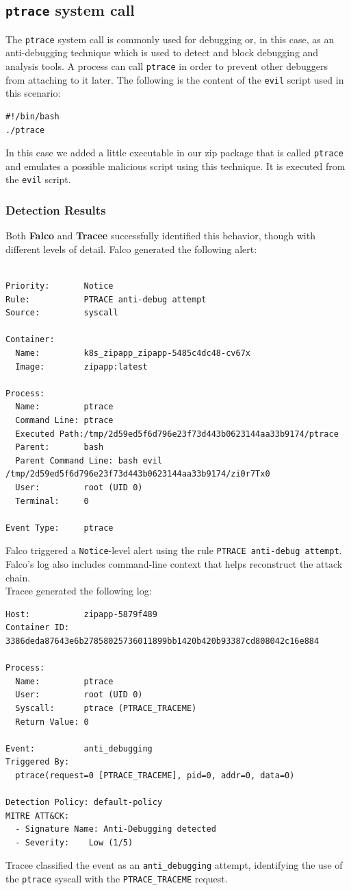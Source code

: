\subsection{\texttt{ptrace} system call}
The \texttt{ptrace} system call is commonly used for debugging or, in this case, as an anti-debugging technique which is used to detect and block debugging and analysis tools. A process can call \texttt{ptrace} in order to prevent other debuggers from attaching to it later. The following is the content of the \texttt{evil} script used in this scenario:
\begin{verbatim}
#!/bin/bash
./ptrace
\end{verbatim}
In this case we added a little executable in our zip package that is called \texttt{ptrace} and emulates a possible malicious script using this technique. It is executed from the \texttt{evil} script.


\subsubsection{Detection Results}
Both \textbf{Falco} and \textbf{Tracee} successfully identified this behavior, though with different levels of detail.
Falco generated the following alert:
\begin{verbatim}

Priority:       Notice
Rule:           PTRACE anti-debug attempt
Source:         syscall

Container:
  Name:         k8s_zipapp_zipapp-5485c4dc48-cv67x
  Image:        zipapp:latest

Process:
  Name:         ptrace
  Command Line: ptrace
  Executed Path:/tmp/2d59ed5f6d796e23f73d443b0623144aa33b9174/ptrace
  Parent:       bash
  Parent Command Line: bash evil /tmp/2d59ed5f6d796e23f73d443b0623144aa33b9174/zi0r7Tx0
  User:         root (UID 0)
  Terminal:     0

Event Type:     ptrace
\end{verbatim}
Falco triggered a \texttt{Notice}-level alert using the rule \texttt{PTRACE anti-debug attempt}. Falco's log also includes command-line context that helps reconstruct the attack chain. \\
Tracee generated the following log:
\begin{verbatim}
Host:           zipapp-5879f489
Container ID:   3386deda87643e6b27858025736011899bb1420b420b93387cd808042c16e884

Process:
  Name:         ptrace
  User:         root (UID 0)
  Syscall:      ptrace (PTRACE_TRACEME)
  Return Value: 0

Event:          anti_debugging
Triggered By:
  ptrace(request=0 [PTRACE_TRACEME], pid=0, addr=0, data=0)

Detection Policy: default-policy
MITRE ATT&CK:
  - Signature Name: Anti-Debugging detected
  - Severity:    Low (1/5)
\end{verbatim}
Tracee classified the event as an \texttt{anti\_debugging} attempt, identifying the use of the \texttt{ptrace} syscall with the \texttt{PTRACE\_TRACEME} request.


